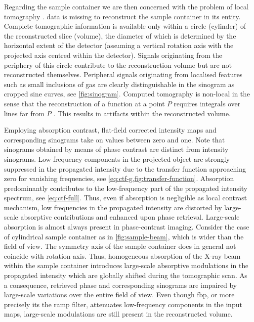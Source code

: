 \documentclass[
twoside,
openright,
titlepage,
numbers=noenddot,
headinclude,
fleqn,
a4paper,
footinclude=true,
cleardoublepage=empty,
abstractoff,
BCOR=5mm,
paper=a4,
fontsize=11pt,
british,ngerman,american,
]{scrreprt}
\begin{document}
Regarding the sample container we are then concerned with the problem
of local tomography \cite{Faridani2001}.  \Ie{} data is missing to
reconstruct the sample container in its entity.  Complete tomographic
information is available only within a circle (cylinder) of the
reconstructed slice (volume), the diameter of which is determined by
the horizontal extent of the detector (assuming a vertical rotation
axis with the projected axis centred within the detector).  Signals
originating from the periphery of this circle contribute to the
reconstruction volume but are not reconstructed themselves.
Peripheral signals originating from localised features such as small
inclusions of gas are clearly distinguishable in the sinogram as
cropped sine curves, see \cref{fig:sinogram}.  Computed tomography is
non-local in the sense that the reconstruction of a function at a
point $P$ requires integrals over lines far from $P$
\cite{Faridani2001}.  This results in artifacts within the
reconstructed volume.

Employing absorption contrast, flat-field corrected intensity maps and
corresponding sinograms take on values between zero and one.  Note
that sinograms obtained by means of phase contrast are distinct from
intensity sinograms. Low-frequency components in the projected object
are strongly suppressed in the propagated intensity due to the
transfer function approaching zero for vanishing frequencies, see
\cref{eq:ctf-g,fig:transfer-function}.  Absorption predominantly
contributes to the low-frequency part of the propagated intensity
spectrum, see \cref{eq:ctf-full}.  Thus, even if absorption is
negligible as local contrast mechanism, low frequencies in the
propagated intensity are distorted by large-scale absorptive
contributions and enhanced upon phase retrieval.  Large-scale
absorption is almost always present in phase-contrast imaging.
Consider \eg{} the case of cylindrical sample container as in
\cref{fig:sample-beam}, which is wider than the field of view.  The
symmetry axis of the sample container does in general not coincide
with rotation axis.  Thus, homogeneous absorption of the X-ray beam
within the sample container introduces large-scale absorptive
modulations in the propagated intensity which are globally shifted
during the tomographic scan.  As a consequence, retrieved phase and
corresponding sinograms are impaired by large-scale variations over
the entire field of view.  Even though \ac{fbp}, or more precisely its
the ramp filter, attenuates low-frequency components in the input
maps, large-scale modulations are still present in the reconstructed
volume.
\end{document}
